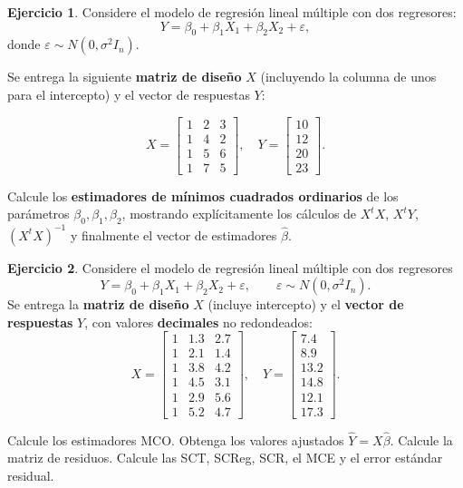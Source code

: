 \documentclass[
  11pt,
]{book}
\theoremstyle{definition}
\theoremstyle{definition}
\theoremstyle{definition}
\newtheorem{exercise}{Ejercicio}[chapter]
\theoremstyle{definition}
\theoremstyle{remark}
\begin{document}
\begin{exercise}
Considere el modelo de regresión lineal múltiple con dos regresores:
\[
Y = \beta_0 + \beta_1 X_1 + \beta_2 X_2 + \varepsilon,
\]
donde \(\varepsilon \sim N(0,\sigma^2I_n)\).

Se entrega la siguiente \textbf{matriz de diseño} \(X\) (incluyendo la columna de unos para el intercepto) y el vector de respuestas \(Y\):

\[
X =
\begin{bmatrix}
1 & 2 & 3 \\
1 & 4 & 2 \\
1 & 5 & 6 \\
1 & 7 & 5
\end{bmatrix},
\quad
Y =
\begin{bmatrix}
10 \\
12 \\
20 \\
23
\end{bmatrix}.
\]

Calcule los \textbf{estimadores de mínimos cuadrados ordinarios} de los parámetros \(\beta_0, \beta_1, \beta_2\), mostrando explícitamente los cálculos de \(X^tX\), \(X^tY\), \((X^tX)^{-1}\) y finalmente el vector de estimadores \(\hat\beta\).
\end{exercise}

\begin{exercise}
Considere el modelo de regresión lineal múltiple con dos regresores
\[
Y=\beta_0+\beta_1X_1+\beta_2X_2+\varepsilon,\qquad \varepsilon\sim N(0,\sigma^2I_n).
\]
Se entrega la \textbf{matriz de diseño} \(X\) (incluye intercepto) y el \textbf{vector de respuestas} \(Y\), con valores \textbf{decimales} no redondeados:
\[
X=
\begin{bmatrix}
1 & 1.3 & 2.7\\
1 & 2.1 & 1.4\\
1 & 3.8 & 4.2\\
1 & 4.5 & 3.1\\
1 & 2.9 & 5.6\\
1 & 5.2 & 4.7
\end{bmatrix},\quad
Y=
\begin{bmatrix}
7.4\\
8.9\\
13.2\\
14.8\\
12.1\\
17.3
\end{bmatrix}.
\]

Calcule los estimadores MCO. Obtenga los valores ajustados \(\hat Y=X\hat\beta\). Calcule la matriz de residuos. Calcule las SCT, SCReg, SCR, el MCE y el error estándar residual.
\end{exercise}
\end{document}
